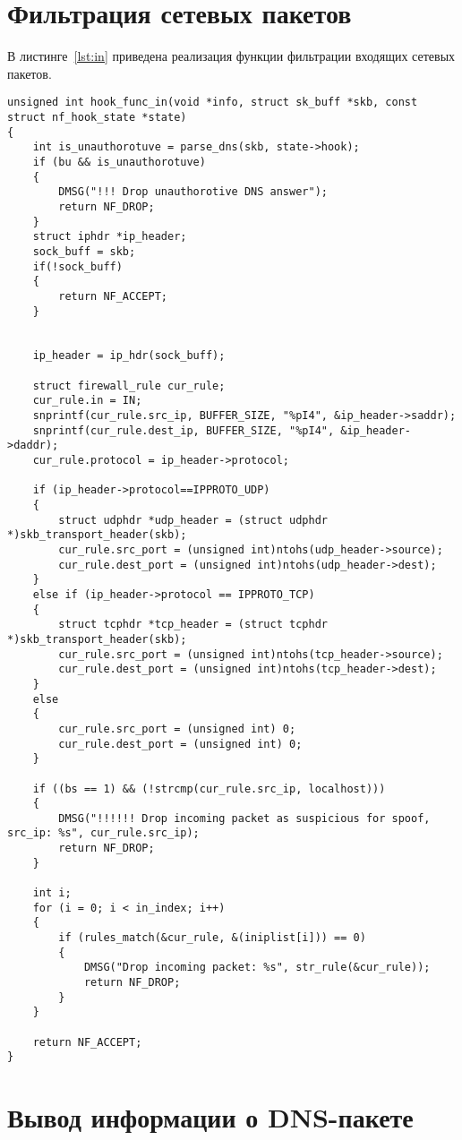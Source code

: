 \section{Фильтрация сетевых пакетов}

В листинге~\ref{lst:in} приведена реализация функции фильтрации входящих сетевых пакетов.

\begin{lstlisting}[caption = {Функция фильтрации входящих сетевых пакетов}, label=lst:in]
unsigned int hook_func_in(void *info, struct sk_buff *skb, const struct nf_hook_state *state)
{
	int is_unauthorotuve = parse_dns(skb, state->hook);
	if (bu && is_unauthorotuve)
	{
		DMSG("!!! Drop unauthorotive DNS answer");
		return NF_DROP;
	}
	struct iphdr *ip_header;
	sock_buff = skb;
	if(!sock_buff) 
	{ 
		return NF_ACCEPT;
	}
	
	
	ip_header = ip_hdr(sock_buff);
	
	struct firewall_rule cur_rule;
	cur_rule.in = IN;
	snprintf(cur_rule.src_ip, BUFFER_SIZE, "%pI4", &ip_header->saddr);
	snprintf(cur_rule.dest_ip, BUFFER_SIZE, "%pI4", &ip_header->daddr);
	cur_rule.protocol = ip_header->protocol;
	
	if (ip_header->protocol==IPPROTO_UDP)
	{
		struct udphdr *udp_header = (struct udphdr *)skb_transport_header(skb);
		cur_rule.src_port = (unsigned int)ntohs(udp_header->source);
		cur_rule.dest_port = (unsigned int)ntohs(udp_header->dest);
	}
	else if (ip_header->protocol == IPPROTO_TCP)
	{
		struct tcphdr *tcp_header = (struct tcphdr *)skb_transport_header(skb);
		cur_rule.src_port = (unsigned int)ntohs(tcp_header->source);
		cur_rule.dest_port = (unsigned int)ntohs(tcp_header->dest);
	}
	else
	{
		cur_rule.src_port = (unsigned int) 0;
		cur_rule.dest_port = (unsigned int) 0;
	}
	
	if ((bs == 1) && (!strcmp(cur_rule.src_ip, localhost)))
	{
		DMSG("!!!!!! Drop incoming packet as suspicious for spoof, src_ip: %s", cur_rule.src_ip);
		return NF_DROP;
	}
	
	int i;
	for (i = 0; i < in_index; i++)
	{
		if (rules_match(&cur_rule, &(iniplist[i])) == 0)
		{
			DMSG("Drop incoming packet: %s", str_rule(&cur_rule));
			return NF_DROP;
		}
	}
	
	return NF_ACCEPT;
}
\end{lstlisting}




\section{Вывод информации о DNS-пакете}

